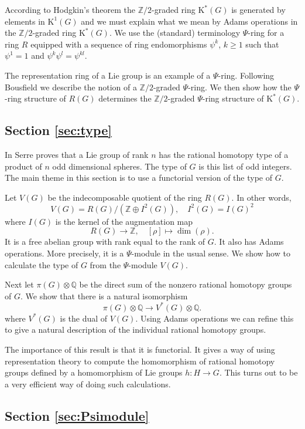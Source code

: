 \documentclass[twoside,a4paper,reqno,11pt]{amsart}
\newcommand{\K}{\mathrm{K}}
\newcommand{\Q}{\mathbb{Q}}
\newcommand{\Z}{\mathbb{Z}}
\renewcommand{\o}{\otimes}
\begin{document}
According to Hodgkin's theorem the $\Z/2$-graded ring $\K^*(G)$ is generated by elements in $\K^1(G)$ and we must explain what we mean by Adams operations in the $\Z/2$-graded ring $\K^*(G)$.  We use the (standard) terminology $\Psi$-ring for a ring $R$ equipped with a sequence of ring endomorphisms $\psi^k$, $k \geq 1$ such that $\psi^1 = 1$ and $\psi^k\psi^l = \psi^{kl}$.  

The representation ring of a Lie group is an example of a $\Psi$-ring.  Following Bousfield \cite{MR1373816} we describe the notion of a $\Z/2$-graded $\Psi$-ring.  We then show how the $\Psi$-ring structure of $R(G)$ determines the $\Z/2$-graded $\Psi$-ring structure of $\K^*(G)$. 

\subsection*{Section \ref{sec:type}} 
In \cite{MR0059548} Serre proves that a Lie group of rank $n$ has the rational homotopy type of a product of $n$ odd dimensional spheres.  The type of $G$ is this list of odd integers.  The main theme in this section is to use a functorial version of the type of $G$.  

Let $V(G)$ be the indecomposable quotient of the ring $R(G)$. In other words,
$$
V(G) = R(G)/(\Z \oplus I^2(G)), \quad I^2(G) = I(G)^2
$$
where $I(G)$ is the kernel of the augmentation map
$$
R(G) \rightarrow \Z, \quad [\rho] \mapsto \dim (\rho).
$$
It is a free abelian group with rank equal to the rank of $G$. It also has Adams operations. More precisely, it is a $\Psi$-module in the usual sense. We show how to calculate the type of $G$ from the $\Psi$-module $V(G)$.

Next let $\pi(G) \o \Q$ be the direct sum of the nonzero rational homotopy groups of $G$.  We show that there is a natural isomorphism
$$
\pi(G)\otimes \Q \to V^*(G)\o\Q.
$$
where $V^*(G)$ is the dual of $V(G)$.  Using Adams operations we can refine this to give a natural description of the individual rational homotopy groups.   

The importance of this result is that it is functorial.  It gives a way of using representation theory to compute the homomorphism of rational homotopy groups defined by a homomorphism of Lie groups $h : H \to G$.  This turns out to be a very efficient way of doing such calculations. 

\subsection*{Section \ref{sec:Psimodule}} 
\end{document}
